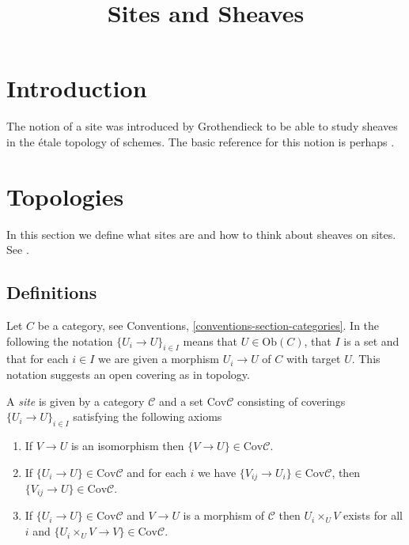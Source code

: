 

%


\title{Sites and Sheaves}


\maketitle

\tableofcontents

\section{Introduction}
\label{section-introduction}

\noindent
The notion of a site was introduced by Grothendieck to be able to study
sheaves in the \'etale topology of schemes. The basic reference for this
notion is perhaps \cite{SGA4}. 

\section{Topologies}
\label{section-topologies}

\noindent
In this section we define what sites are and how to think about sheaves
on sites. See \cite{ArtinTopologies}.

\subsection{Definitions}
\label{subsection-sites-definitions}

\noindent
Let $C$ be a category, see Conventions, 
\autoref{conventions-section-categories}. 
In the following the notation $\{U_i \to U\}_{i\in I}$ means that 
$U \in \text{Ob}(C)$, that $I$ is a set and that for each $i\in I$ 
we are given a morphism $U_i \to U$ of $C$ with target $U$. This
notation suggests an open covering as in topology.

\begin{definition}
\label{definition-site}
A {\it site} is given by a category $\mathcal{C}$ and a set 
$\text{Cov} \mathcal{C}$ consisting of coverings 
$\{U_i \to U\}_{i \in I}$ satisfying the following axioms
\begin{enumerate}
\item If $V \to U$ is an isomorphism then $\{V \to U\} \in 
\text{Cov} \mathcal{C}$.
\item If $\{U_i \to U\} \in \text{Cov} \mathcal{C}$ and for each
$i$ we have $\{V_{ij} \to U_i\} \in \text{Cov} \mathcal{C}$, then
$\{V_{ij} \to U\} \in \text{Cov} \mathcal{C}$.
\item If $\{U_i \to U\}\in \text{Cov} \mathcal{C}$ and $V \to U$ is a
morphism of $\mathcal{C}$ then $U_i \times_U V$ exists for all
$i$ and $\{U_i \times_U V \to V \} \in \text{Cov} \mathcal{C}$.
\end{enumerate}
\end{definition}

